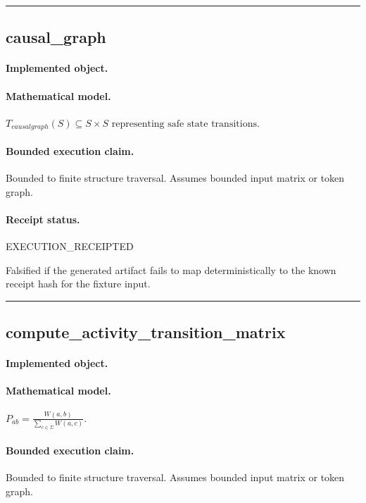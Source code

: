 \vspace{1em}\hrule\vspace{1em}
\subsection{causal\_graph}
\paragraph{Implemented object.} 
\paragraph{Mathematical model.} $T_{causalgraph}(S) \subseteq S \times S \text{ representing safe state transitions}.$
\paragraph{Bounded execution claim.} Bounded to finite structure traversal. Assumes bounded input matrix or token graph.
\paragraph{Receipt status.} EXECUTION\_RECEIPTED
\begin{falsifier}
Falsified if the generated artifact fails to map deterministically to the known receipt hash for the fixture input.
\end{falsifier}

\vspace{1em}\hrule\vspace{1em}
\subsection{compute\_activity\_transition\_matrix}
\paragraph{Implemented object.} 
\paragraph{Mathematical model.} $P_{ab} = \frac{W(a,b)}{\sum_{c\in\Sigma}W(a,c)}.$
\paragraph{Bounded execution claim.} Bounded to finite structure traversal. Assumes bounded input matrix or token graph.
